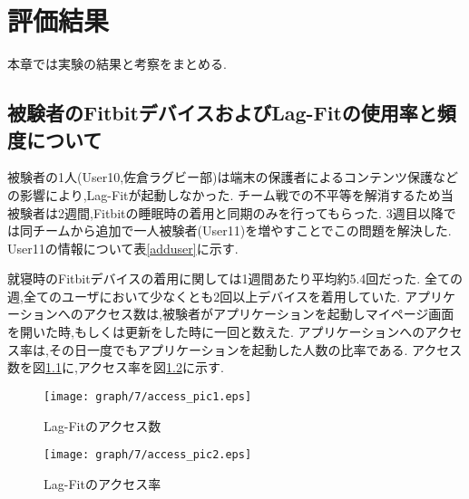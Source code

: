 \chapter{評価結果}
本章では実験の結果と考察をまとめる.

\section{被験者のFitbitデバイスおよびLag-Fitの使用率と頻度について}
被験者の1人(User10,佐倉ラグビー部)は端末の保護者によるコンテンツ保護などの影響により,Lag-Fitが起動しなかった.
チーム戦での不平等を解消するため当被験者は2週間,Fitbitの睡眠時の着用と同期のみを行ってもらった.
3週目以降では同チームから追加で一人被験者(User11)を増やすことでこの問題を解決した.
User11の情報について表\ref{adduser}に示す.
\begin{table}[htbp]
	\begin{center}
 	\end{center}
 	\caption{追加した被験者のデータ}
 	\label{adduser}
\end{table}

就寝時のFitbitデバイスの着用に関しては1週間あたり平均約5.4回だった.
全ての週,全てのユーザにおいて少なくとも2回以上デバイスを着用していた.
アプリケーションへのアクセス数は,被験者がアプリケーションを起動しマイページ画面を開いた時,もしくは更新をした時に一回と数えた.
アプリケーションへのアクセス率は,その日一度でもアプリケーションを起動した人数の比率である.
アクセス数を図\ref{access1}に,アクセス率を図\ref{access2}に示す.

\begin{figure}[tbp]
	\begin{center}
		\texttt{[image: graph/7/access\_pic1.eps]}
		\caption{Lag-Fitのアクセス数}
		\label{access1}
	\end{center}
\end{figure}

\begin{figure}[tbp]
	\begin{center}
		\texttt{[image: graph/7/access\_pic2.eps]}
		\caption{Lag-Fitのアクセス率}
		\label{access2}
	\end{center}
\end{figure}

